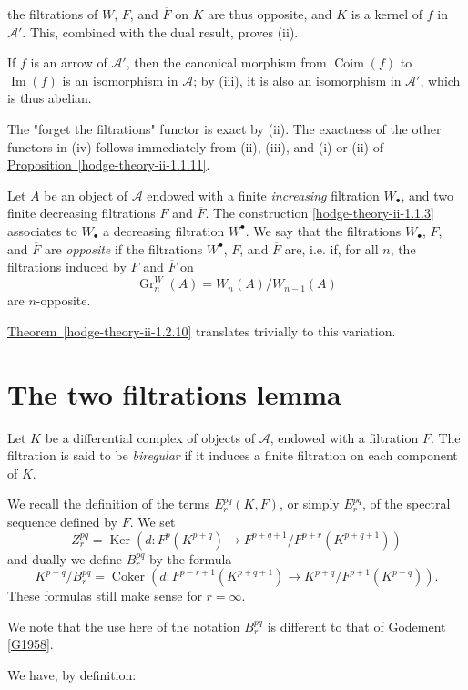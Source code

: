     the filtrations of \(W\), \(F\), and \(\overline {F}\) on \(K\) are thus opposite, and \(K\) is a kernel of \(f\) in \(\mathscr {A}'\).
    This, combined with the dual result, proves (ii).\par{}If \(f\) is an arrow of \(\mathscr {A}'\), then the canonical morphism from \(\operatorname {Coim}(f)\) to \(\operatorname {Im}(f)\) is an isomorphism in \(\mathscr {A}\);
    by (iii), it is also an isomorphism in \(\mathscr {A}'\), which is thus abelian.\par{}The "forget the filtrations" functor is exact by (ii).
    The exactness of the other functors in (iv) follows immediately from (ii), (iii), and (i) or (ii) of \hyperref[hodge-theory-ii-1.1.11]{Proposition~\ref*{hodge-theory-ii-1.1.11}}.\label{hodge-theory-ii-1.2.13}\par{}Let \(A\) be an object of \(\mathscr {A}\) endowed with a finite \emph{increasing} filtration \(W_\bullet \), and two finite decreasing filtrations \(F\) and \(\overline {F}\).
    The construction \cref{hodge-theory-ii-1.1.3} associates to \(W_\bullet \) a decreasing filtration \(W^\bullet \).
    We say that the filtrations \(W_\bullet \), \(F\), and \(\overline {F}\) are \emph{opposite} if the filtrations \(W^\bullet \), \(F\), and \(\overline {F}\) are, i.e. if, for all \(n\), the filtrations induced by \(F\) and \(\overline {F}\) on
    \[       \operatorname {Gr}_n^W(A)       = W_n(A)/W_{n-1}(A)     \]
    are \(n\)-opposite.\par{}\hyperref[hodge-theory-ii-1.2.10]{Theorem~\ref*{hodge-theory-ii-1.2.10}} translates trivially to this variation.\section{The two filtrations lemma}\label{hodge-theory-ii-1.3}\label{hodge-theory-ii-1.3.1}\par{}Let \(K\) be a differential complex of objects of \(\mathscr {A}\), endowed with a filtration \(F\).
    The filtration is said to be \emph{biregular} if it induces a finite filtration on each component of \(K\).\par{}We recall the definition of the terms \(E_r^{pq}(K,F)\), or simply \(E_r^{pq}\), of the spectral sequence defined by \(F\).
    We set
    \[       Z_r^{pq}       = \operatorname {Ker}(d\colon  F^p(K^{p+q})\to  F^{p+q+1}/F^{p+r}(K^{p+q+1}))     \]
    and dually we define \(B_r^{pq}\) by the formula
    \[       K^{p+q}/B_r^{pq}       = \operatorname {Coker}(d\colon  F^{p-r+1}(K^{p+q+1})\to  K^{p+q}/F^{p+1}(K^{p+q})).     \]
    These formulas still make sense for \(r=\infty \).\par{}We note that the use here of the notation \(B_r^{pq}\) is different to that of Godement \hyperref[G1958]{[G1958]}.\par{}We have, by definition:

